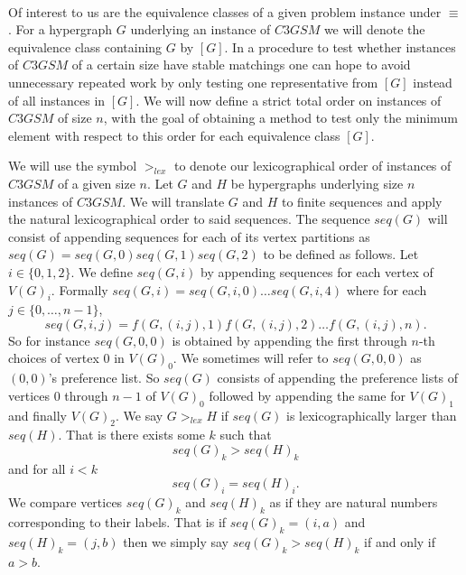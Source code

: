 \paragraph{}
Of interest to us are the equivalence classes of a given problem instance under $\equiv$. For a hypergraph $G$ underlying an instance of $C3GSM$ we will denote the equivalence class containing $G$ by $[G]$. In a procedure to test whether instances of $C3GSM$ of a certain size have stable matchings one can hope to avoid unnecessary repeated work by only testing one representative from $[G]$ instead of all instances in $[G]$. We will now define a strict total order on instances of $C3GSM$ of size $n$, with the goal of obtaining a method to test only the minimum element with respect to this order for each equivalence class $[G]$.
\begin{definition}
We will use the symbol $>_{lex}$ to denote our lexicographical order of instances of $C3GSM$ of a given size $n$. Let $G$ and $H$ be hypergraphs underlying size $n$ instances of $C3GSM$. We will translate $G$ and $H$ to finite sequences and apply the natural lexicographical order to said sequences. The sequence $seq(G)$ will consist of appending sequences for each of its vertex partitions as $seq(G) = seq(G,0)seq(G,1)seq(G,2)$ to be defined as follows. Let $i \in \{0,1, 2\}$.  We define $seq(G,i)$ by appending sequences for each vertex of $V(G)_i$. Formally $seq(G,i) = seq(G,i,0)\dots seq(G,i,4)$ where for each $j \in \{0,\dots, n-1\}$,
$$seq(G,i,j) = f(G,(i,j),1)f(G,(i,j),2)\dots f(G,(i,j),n).$$
So for instance $seq(G,0, 0)$ is obtained by appending the first through $n$-th choices of vertex $0$ in $V(G)_0$. We sometimes will refer to $seq(G,0,0)$ as $(0,0)$'s preference list. So $seq(G)$ consists of appending the preference lists of vertices $0$ through $n-1$ of $V(G)_0$ followed by appending the same for $V(G)_1$ and finally $V(G)_2$.
We say $G >_{lex} H$ if $seq(G)$ is lexicographically larger than $seq(H)$. That is there exists some $k$ such that
$$seq(G)_k > seq(H)_k$$
and for all $i < k$
$$seq(G)_i = seq(H)_i.$$
We compare vertices $seq(G)_k$ and $ seq(H)_k$ as if they are natural numbers corresponding to their labels. That is if $seq(G)_k = (i,a)$ and $seq(H)_k = (j,b)$ then we simply say $seq(G)_k > seq(H)_k$ if and only if $a>b$. 
\end{definition}
